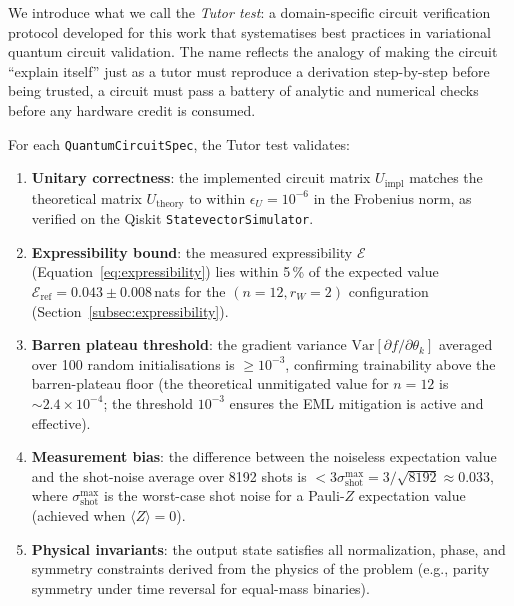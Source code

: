 \documentclass[11pt,a4paper, english]{book}
\theoremstyle{plain}
\theoremstyle{definition}
\numberwithin{equation}{chapter}
\numberwithin{figure}{chapter}
\numberwithin{table}{chapter}
\begin{document}
We introduce what we call the \emph{Tutor test}: a domain-specific circuit
verification protocol developed for this work that systematises best practices
in variational quantum circuit validation.  The name reflects the analogy of
making the circuit ``explain itself''  just as a tutor must reproduce a
derivation step-by-step before being trusted, a circuit must pass a battery
of analytic and numerical checks before any hardware credit is consumed.

For each \texttt{QuantumCircuitSpec}, the Tutor test validates:

\begin{enumerate}
  \item \textbf{Unitary correctness}: the implemented circuit matrix
        $U_\mathrm{impl}$ matches the theoretical matrix $U_\mathrm{theory}$
        to within $\epsilon_U = 10^{-6}$ in the Frobenius norm, as verified
        on the Qiskit \texttt{StatevectorSimulator}.

  \item \textbf{Expressibility bound}: the measured expressibility
        $\mathcal{E}$ (Equation~\ref{eq:expressibility}) lies within 5\,\% of the expected value 
$\mathcal{E}_\mathrm{ref} = 0.043 \pm 0.008$\,nats 
for the $(n=12, r_W=2)$ configuration 
(Section~\ref{subsec:expressibility}).

  \item \textbf{Barren plateau threshold}: the gradient variance
        $\mathrm{Var}[\partial f/\partial\theta_k]$ averaged over 100
        random initialisations is $\geq 10^{-3}$, confirming trainability above the 
barren-plateau floor (the theoretical unmitigated 
value for $n=12$ is $\sim 2.4\times10^{-4}$; 
the threshold $10^{-3}$ ensures the EML mitigation 
is active and effective).

  \item \textbf{Measurement bias}: the difference between the noiseless
        expectation value and the shot-noise average over 8192 shots is
        $< 3\sigma_\mathrm{shot}^\mathrm{max} = 3/\sqrt{8192} 
\approx 0.033$, where $\sigma_\mathrm{shot}^\mathrm{max}$ 
is the worst-case shot noise for a Pauli-$Z$ expectation 
value (achieved when $\langle Z\rangle = 0$).

  \item \textbf{Physical invariants}: the output state satisfies all
        normalization, phase, and symmetry constraints derived from the
        physics of the problem (e.g., parity symmetry under time reversal
        for equal-mass binaries).
\end{enumerate}
\end{document}
